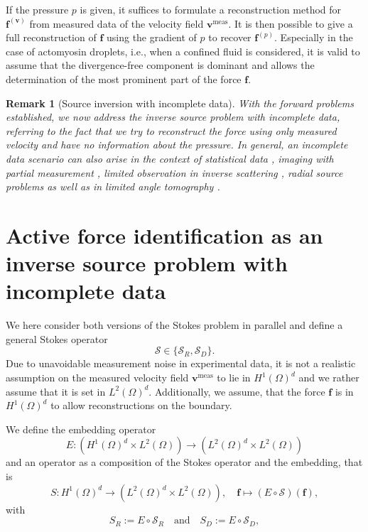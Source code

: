 \documentclass[final,leqno]{scrarticle}
\newtheorem{remark}[theorem]{Remark}
\newcommand{\calS}{\mathcal{S}}
\newcommand{\lzo}{L^2(\Omega)}
\newcommand{\Hd}{{H^1(\Omega)^d}}
\newcommand{\lzd}{{L^2(\Omega)^d}}
\begin{document}
If the pressure $p$ is given, it suffices to formulate a reconstruction method for $\mathbf{f}^{(\mathbf{v})}$ from measured data of the velocity field $\mathbf{v}^{\operatorname{meas}}$. 
It is then possible to give a full reconstruction of $\mathbf{f}$ using the gradient of $p$ to recover $\mathbf{f}^{(p)}$. 
Especially in the case of actomyosin droplets, i.e., when a confined fluid is considered, it is valid to assume that the divergence-free component is dominant and allows the determination of the most prominent part of the force $\mathbf{f}$.

\begin{remark}[Source inversion with incomplete data]
    With the forward problems established, we now address the inverse source problem with incomplete data,     referring to the fact that we try to reconstruct the force using only measured velocity and have no information about the pressure. In general, an incomplete data scenario can also arise in the context of statistical data \cite{Evans2002}, imaging with partial measurement \cite{Moscoso2020}, limited observation in inverse scattering \cite{GaoZhang2021}, radial source problems \cite{Hubenthal2011}
    as well as in limited angle tomography \cite{Bubba_2019, Frikel_2013}. 
\end{remark}

\section{Active force identification as an inverse source problem with incomplete data \label{sec:inv_prob}}

We here consider both versions of the Stokes problem in parallel and define a general Stokes operator 
\begin{displaymath}
    \calS \in \lbrace \calS_R, \calS_D \rbrace .
\end{displaymath}
Due to unavoidable measurement noise in experimental data, it is not a realistic assumption on the measured velocity field $\mathbf{v}^{\text{meas}}$ to lie in $\Hd$ and we rather assume that it is set in $\lzd$. Additionally, we assume, that the force $\mathbf{f}$ is in $\Hd$ to allow reconstructions on the boundary. 

We define the embedding operator 
\begin{displaymath}
    E : \left(\Hd \times \lzo\right) \to \left(\lzd \times \lzo \right)
\end{displaymath}
and an operator as a composition of the Stokes operator and the embedding, that is 
\begin{equation}\label{eq:S_embedded}
    S : \Hd  \rightarrow \left(\lzd \times \lzo\right) , \quad\mathbf{f} \mapsto (E \circ \calS ) (\mathbf{f}) ,
\end{equation}
with 
\begin{displaymath}
    S_R:= E \circ \calS_R \quad \text{and} \quad S_D:=E\circ \calS_D,
\end{displaymath}
\end{document}
